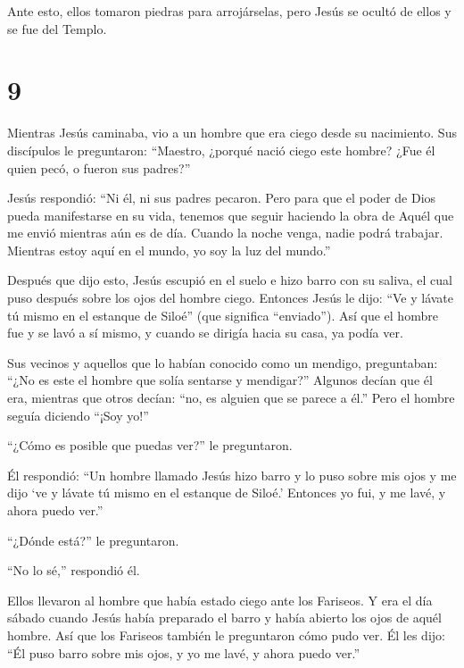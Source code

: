 Ante esto, ellos tomaron piedras para arrojárselas, pero
Jesús se ocultó de ellos y se fue del Templo.

\hypertarget{section-8}{%
\section{9}\label{section-8}}

 Mientras Jesús caminaba, vio a un hombre que era ciego
desde su nacimiento.  Sus discípulos le preguntaron:
``Maestro, ¿porqué nació ciego este hombre? ¿Fue él quien pecó, o fueron
sus padres?''

 Jesús respondió: ``Ni él, ni sus padres pecaron. Pero para
que el poder de Dios pueda manifestarse en su vida,  tenemos
que seguir haciendo la obra de Aquél que me envió mientras aún es de
día. Cuando la noche venga, nadie podrá trabajar.  Mientras
estoy aquí en el mundo, yo soy la luz del mundo.''

 Después que dijo esto, Jesús escupió en el suelo e hizo
barro con su saliva, el cual puso después sobre los ojos del hombre
ciego.  Entonces Jesús le dijo: ``Ve y lávate tú mismo en el
estanque de Siloé'' (que significa ``enviado''). Así que el hombre fue y
se lavó a sí mismo, y cuando se dirigía hacia su casa, ya podía ver.

 Sus vecinos y aquellos que lo habían conocido como un
mendigo, preguntaban: ``¿No es este el hombre que solía sentarse y
mendigar?''  Algunos decían que él era, mientras que otros
decían: ``no, es alguien que se parece a él.'' Pero el hombre seguía
diciendo ``¡Soy yo!''

 ``¿Cómo es posible que puedas ver?'' le preguntaron.

 Él respondió: ``Un hombre llamado Jesús hizo barro y lo
puso sobre mis ojos y me dijo `ve y lávate tú mismo en el estanque de
Siloé.' Entonces yo fui, y me lavé, y ahora puedo ver.''

 ``¿Dónde está?'' le preguntaron.

``No lo sé,'' respondió él.

 Ellos llevaron al hombre que había estado ciego ante los
Fariseos.  Y era el día sábado cuando Jesús había preparado
el barro y había abierto los ojos de aquél hombre.  Así que
los Fariseos también le preguntaron cómo pudo ver. Él les dijo: ``Él
puso barro sobre mis ojos, y yo me lavé, y ahora puedo ver.''

